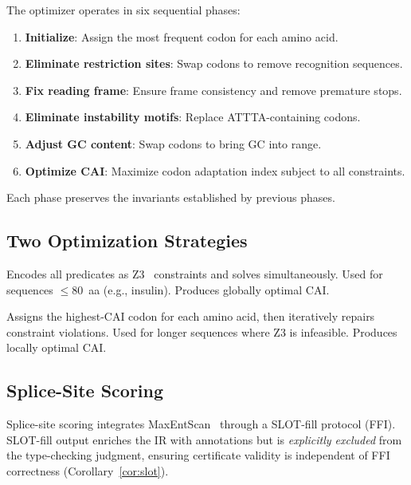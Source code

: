 \documentclass[runningheads]{llncs}
\begin{document}
The optimizer operates in six sequential phases:
\begin{enumerate}[leftmargin=*,itemsep=0pt,topsep=1pt]
\item \textbf{Initialize}: Assign the most frequent codon for each
      amino acid.
\item \textbf{Eliminate restriction sites}: Swap codons to remove
      recognition sequences.
\item \textbf{Fix reading frame}: Ensure frame consistency and remove
      premature stops.
\item \textbf{Eliminate instability motifs}: Replace ATTTA-containing
      codons.
\item \textbf{Adjust GC content}: Swap codons to bring GC into range.
\item \textbf{Optimize CAI}: Maximize codon adaptation index subject to
      all constraints.
\end{enumerate}
Each phase preserves the invariants established by previous phases.

\subsection{Two Optimization Strategies}

\begin{description}[leftmargin=!,labelwidth=2.8cm,itemsep=1pt,
                     topsep=1pt]
\item[Constraint-first (Z3):] Encodes all predicates as
      Z3~\cite{demoura2008z3} constraints and solves simultaneously.
      Used for sequences $\le 80$~aa (e.g., insulin).
      Produces globally optimal CAI.

\item[CAI-first (greedy):] Assigns the highest-CAI codon for each
      amino acid, then iteratively repairs constraint violations.
      Used for longer sequences where Z3 is infeasible.
      Produces locally optimal CAI.
\end{description}

\subsection{Splice-Site Scoring}

Splice-site scoring integrates MaxEntScan~\cite{yarden2006maxentscan}
through a SLOT-fill protocol (FFI).
SLOT-fill output enriches the IR with annotations but is
\emph{explicitly excluded} from the type-checking judgment, ensuring
certificate validity is independent of FFI correctness
(Corollary~\ref{cor:slot}).
\end{document}

